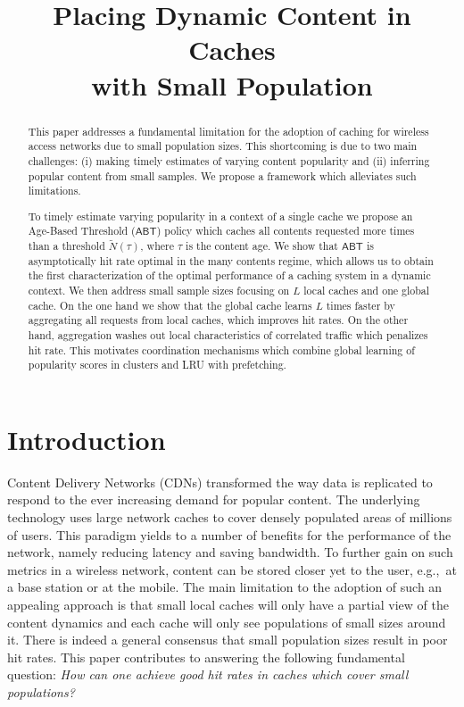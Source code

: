 \documentclass[10pt, conference, letterpaper]{IEEEtran}
\title{Placing Dynamic Content in Caches \\with Small Population}
\author{
\IEEEauthorblockN{Mathieu Leconte, Georgios Paschos, Lazaros Gkatzikis, Moez Draief, Spyridon Vassilaras, Symeon Chouvardas}
\IEEEauthorblockA{Mathematical and Algorithmic Sciences Lab, France Research Center, Huawei Technologies Co., Ltd.\\
Email: firstname.lastname@huawei.com}
}
\newcommand{\ABT}{\textsf{ABT}}
\begin{document}
\maketitle
\begin{abstract}
This paper addresses a fundamental limitation for the adoption of caching for wireless access networks due to small population sizes. This shortcoming is due to two main challenges: (i) making timely estimates of varying content popularity and (ii) inferring popular content from small samples. We propose a framework which alleviates such limitations. 

To timely estimate varying popularity in a context of a single cache we propose an Age-Based Threshold ($\ABT$) policy which caches all contents requested more times than a threshold $\widetilde N(\tau)$, where $\tau$ is the content age.
We show that $\ABT$ is asymptotically hit rate optimal in the many contents regime, which allows us to obtain the first characterization of the optimal performance of a caching system in a dynamic context. 
We then address small sample sizes focusing on $L$ local caches and one global cache. On the one hand we show that the global cache learns $L$ times faster by aggregating all requests from local caches, which improves hit rates. On the other hand, aggregation washes out local characteristics of correlated traffic which penalizes hit rate.
This motivates coordination mechanisms which combine global learning of popularity scores in clusters and LRU with prefetching.  
\end{abstract}
\vspace{-0.2in}
\section{Introduction}
Content Delivery Networks (CDNs) transformed the way data is replicated to respond to the ever increasing demand for popular content. The underlying technology uses large network caches to cover densely populated areas of millions of users. This paradigm yields to a number of benefits for the performance of the network, namely reducing latency and saving bandwidth. To further gain on such metrics in a wireless network, content can be stored closer yet to the user, e.g.,~at a base station or at the mobile. The main limitation to the adoption of such an appealing approach is that small local caches will only have a partial view of the content dynamics and each cache will only see populations of small sizes around it. There is indeed a general consensus that small population sizes result in poor hit rates. 
This paper contributes to answering the following fundamental question: \emph{How can one achieve good hit rates in caches which cover small populations?}
\end{document}
